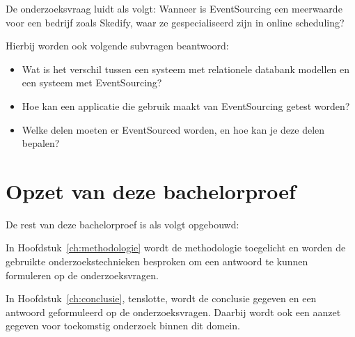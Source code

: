 De onderzoeksvraag luidt als volgt: Wanneer is EventSourcing een meerwaarde voor een bedrijf zoals Skedify, waar ze gespecialiseerd zijn in online scheduling?

Hierbij worden ook volgende subvragen beantwoord:

\begin{itemize}
    \item Wat is het verschil tussen een systeem met relationele databank modellen en een systeem met EventSourcing?
    \item Hoe kan een applicatie die gebruik maakt van EventSourcing getest worden?
    \item Welke delen moeten er EventSourced worden, en hoe kan je deze delen bepalen?
\end{itemize}

\section{Opzet van deze bachelorproef}
\label{sec:opzet-bachelorproef}


De rest van deze bachelorproef is als volgt opgebouwd:

In Hoofdstuk~\ref{ch:methodologie} wordt de methodologie toegelicht en worden de gebruikte onderzoekstechnieken besproken om een antwoord te kunnen formuleren op de onderzoeksvragen.


In Hoofdstuk~\ref{ch:conclusie}, tenslotte, wordt de conclusie gegeven en een antwoord geformuleerd op de onderzoeksvragen. Daarbij wordt ook een aanzet gegeven voor toekomstig onderzoek binnen dit domein.

